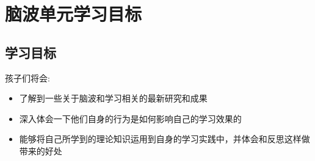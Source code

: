 \chapter{脑波单元学习目标}
\section{学习目标}
    孩子们将会:
    \begin{itemize}
      \item  了解到一些关于脑波和学习相关的最新研究和成果
      \item  深入体会一下他们自身的行为是如何影响自己的学习效果的
      \item  能够将自己所学到的理论知识运用到自身的学习实践中，并体会和反思这样做带来的好处
    \end{itemize}  

